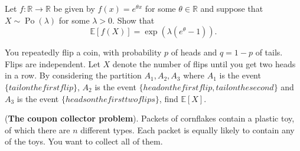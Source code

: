 \documentclass[answers]{exam}
\begin{document}
\begin{questions}
\question%
Let $f: \mathbb{R} \rightarrow \mathbb{R}$ be given by $f(x)=e^{\theta x}$ for some $\theta \in \mathbb{R}$ and suppose that $X \sim \operatorname{Po}(\lambda)$ for some $\lambda>0$. Show that \[
	\mathbb{E}[f(X)]=\exp(\lambda(e^{\theta}-1)).
\]



\question%
You repeatedly flip a coin, with probability $p$ of heads and $q=1-p$ of tails. Flips are independent. Let $X$ denote the number of flips until you get two heads in a row. By considering the partition $A_{1}, A_{2}, A_{3}$ where $A_{1}$ is the event $\{tail on the first flip\}$, $A_{2}$ is the event $\{head on the first flip, tail on the second\}$ and $A_{3}$ is the event $\{heads on the first two flips\}$, find $\mathbb{E}[X]$.



\question%
(\textbf{The coupon collector problem}). Packets of cornflakes contain a plastic toy, of which there are $n$ different types. Each packet is equally likely to contain any of the toys. You want to collect all of them.

\end{questions}
\end{document}
